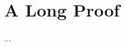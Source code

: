 \documentclass[12pt,american]{report}
\begin{document}

\begin{singlespace}

\end{singlespace}

\appendix
\chapter{A Long Proof}
  ...
\end{document}
